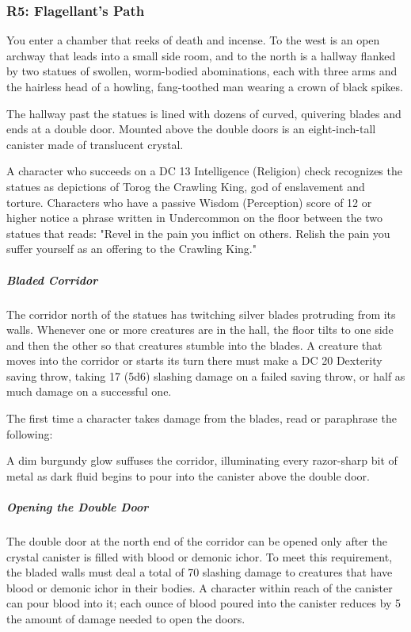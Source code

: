 \documentclass[10pt,a4paper,twoside,fancy,bg=print,twocolumn,openany,nodeprecatedcode]{dndbook}
\begin{document}
\subsubsection{R5: Flagellant's Path}
\begin{DndReadAloud}{}
You enter a chamber that reeks of death and incense. To the west is an open archway that leads into a small side room, and to the north is a hallway flanked by two statues of swollen, worm-bodied abominations, each with three arms and the hairless head of a howling, fang-toothed man wearing a crown of black spikes.

The hallway past the statues is lined with dozens of curved, quivering blades and ends at a double door. Mounted above the double doors is an eight-inch-tall canister made of translucent crystal.

\end{DndReadAloud}

A character who succeeds on a DC 13 Intelligence (Religion) check recognizes the statues as depictions of Torog the Crawling King, god of enslavement and torture. Characters who have a passive Wisdom (Perception) score of 12 or higher notice a phrase written in Undercommon on the floor between the two statues that reads: "Revel in the pain you inflict on others. Relish the pain you suffer yourself as an offering to the Crawling King."

\subparagraph{Bladed Corridor}
The corridor north of the statues has twitching silver blades protruding from its walls. Whenever one or more creatures are in the hall, the floor tilts to one side and then the other so that creatures stumble into the blades. A creature that moves into the corridor or starts its turn there must make a DC 20 Dexterity saving throw, taking 17 (5d6) slashing damage on a failed saving throw, or half as much damage on a successful one.

The first time a character takes damage from the blades, read or paraphrase the following:

\begin{DndReadAloud}{}
A dim burgundy glow suffuses the corridor, illuminating every razor-sharp bit of metal as dark fluid begins to pour into the canister above the double door.

\end{DndReadAloud}

\subparagraph{Opening the Double Door}
The double door at the north end of the corridor can be opened only after the crystal canister is filled with blood or demonic ichor. To meet this requirement, the bladed walls must deal a total of 70 slashing damage to creatures that have blood or demonic ichor in their bodies. A character within reach of the canister can pour blood into it; each ounce of blood poured into the canister reduces by 5 the amount of damage needed to open the doors.
\end{document}
